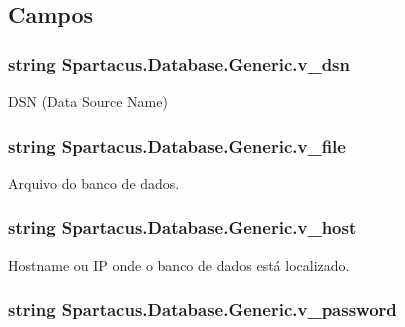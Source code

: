 \subsection{Campos}
\hypertarget{classSpartacus_1_1Database_1_1Generic_a91f7c26ea6ab2875fbeafc42905b423f}{
\subsubsection[{v\+\_\+dsn}]{\setlength{\rightskip}{0pt plus 5cm}string Spartacus.\+Database.\+Generic.\+v\+\_\+dsn}}\label{classSpartacus_1_1Database_1_1Generic_a91f7c26ea6ab2875fbeafc42905b423f}


D\+S\+N (Data Source Name) 

\hypertarget{classSpartacus_1_1Database_1_1Generic_a2afdda7bc7ad1bad84a5dc08bf6bd4e6}{
\subsubsection[{v\+\_\+file}]{\setlength{\rightskip}{0pt plus 5cm}string Spartacus.\+Database.\+Generic.\+v\+\_\+file}}\label{classSpartacus_1_1Database_1_1Generic_a2afdda7bc7ad1bad84a5dc08bf6bd4e6}


Arquivo do banco de dados. 

\hypertarget{classSpartacus_1_1Database_1_1Generic_adcf095a019d81c98b5f4c23ffe010cc4}{
\subsubsection[{v\+\_\+host}]{\setlength{\rightskip}{0pt plus 5cm}string Spartacus.\+Database.\+Generic.\+v\+\_\+host}}\label{classSpartacus_1_1Database_1_1Generic_adcf095a019d81c98b5f4c23ffe010cc4}


Hostname ou I\+P onde o banco de dados está localizado. 

\hypertarget{classSpartacus_1_1Database_1_1Generic_a7a40ef878e5d8371034ced66a7b7b2bb}{
\subsubsection[{v\+\_\+password}]{\setlength{\rightskip}{0pt plus 5cm}string Spartacus.\+Database.\+Generic.\+v\+\_\+password}}\label{classSpartacus_1_1Database_1_1Generic_a7a40ef878e5d8371034ced66a7b7b2bb}


